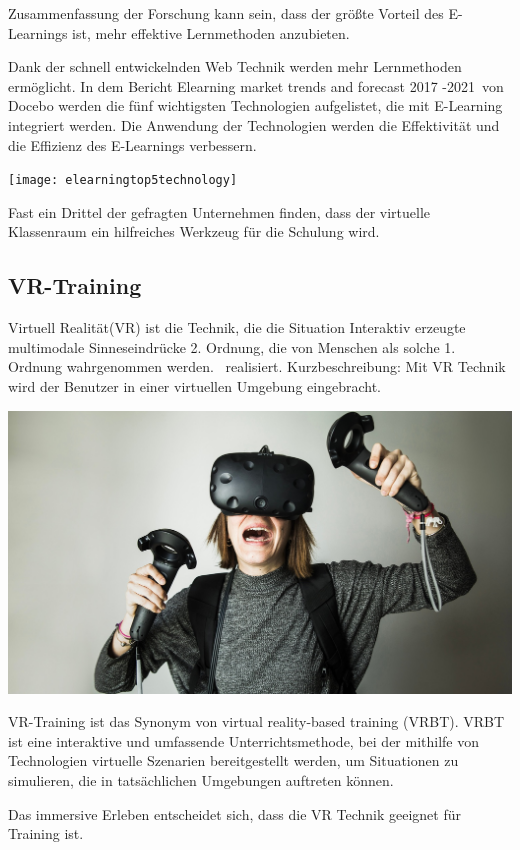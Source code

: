 Zusammenfassung der Forschung kann sein, dass der größte Vorteil des E-Learnings ist, mehr effektive Lernmethoden anzubieten.

Dank der schnell entwickelnden Web Technik werden mehr Lernmethoden ermöglicht. In dem Bericht \glqq Elearning market trends and forecast 2017 -2021\grqq\ von Docebo werden die fünf wichtigsten Technologien aufgelistet, die mit E-Learning integriert werden. Die Anwendung der Technologien werden die Effektivität und die Effizienz des E-Learnings verbessern.

\texttt{[image: elearningtop5technology]}

Fast ein Drittel der gefragten Unternehmen finden, dass der virtuelle Klassenraum ein hilfreiches Werkzeug für die Schulung wird.

 \subsection{VR-Training}
 
Virtuell Realität(VR) ist die Technik, die die Situation \glqq Interaktiv erzeugte multimodale Sinneseindrücke 2. Ordnung, die von Menschen als solche 1. Ordnung wahrgenommen werden.\grqq\ \citep{9} realisiert. Kurzbeschreibung: Mit VR Technik wird der Benutzer in einer virtuellen Umgebung eingebracht.

\includegraphics[width=\textwidth]{images/vrhtcvive.jpg}

VR-Training ist das Synonym von virtual reality-based training (VRBT). \glqq VRBT ist eine interaktive und umfassende Unterrichtsmethode, bei der mithilfe von Technologien virtuelle Szenarien bereitgestellt werden, um Situationen zu simulieren, die in tatsächlichen Umgebungen auftreten können. \grqq\ \citep{14}

Das immersive Erleben entscheidet sich, dass die VR Technik geeignet für Training ist.

